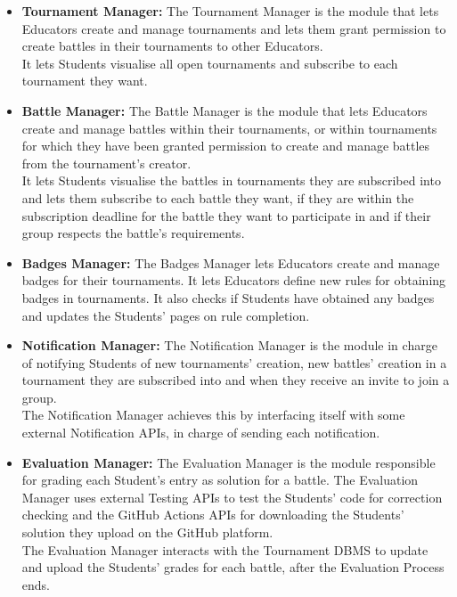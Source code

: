 \documentclass{article}
\begin{document}
{\begin{itemize}
\item \textbf{Tournament Manager:} The Tournament Manager is the module that lets Educators 
create and manage tournaments and lets them grant permission
to create battles in their tournaments to other Educators. \\
It lets Students visualise all open tournaments and subscribe to each tournament they want. \\
\item \textbf{Battle Manager:} The Battle Manager is the module that lets Educators create and manage battles within their tournaments, or within tournaments
for which they have been granted permission to create and manage battles from the tournament's creator. \\
It lets Students visualise the battles in tournaments they are subscribed into and lets them subscribe to each battle they want, if they are within 
the subscription deadline for the battle they want to participate in and if their group respects the battle's requirements. \\
\item \textbf{Badges Manager:} The Badges Manager lets Educators create and manage badges for their tournaments. It lets Educators define new rules for obtaining
badges in tournaments. It also checks if Students have obtained any badges and updates the Students' pages on rule completion. \\
\item \textbf{Notification Manager:} The Notification Manager is the module in charge of notifying Students of new tournaments' creation, new battles' creation
in a tournament they are subscribed into and when they receive an invite to join a group. \\
The Notification Manager achieves this by interfacing itself with some external Notification APIs, in charge of sending each notification. \\
\item \textbf{Evaluation Manager:} The Evaluation Manager is the module responsible for grading each Student's entry as solution for a battle.
The Evaluation Manager uses external Testing APIs to test the Students' code for correction checking and the GitHub Actions APIs for downloading the Students'
solution they upload on the GitHub platform.\\
The Evaluation Manager interacts with the Tournament DBMS to update and upload the Students' grades for each battle, after the Evaluation Process ends.\\

\end{itemize}}
\end{document}
